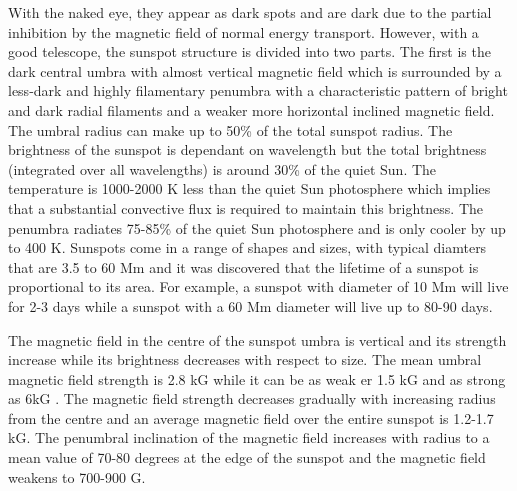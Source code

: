 	With the naked eye, they appear as dark spots and are dark due to the partial inhibition by the magnetic field  of normal energy transport.
	However, with a good telescope, the sunspot structure is divided into two parts.
	The first is the dark central umbra with almost vertical magnetic field which is surrounded by a less-dark and highly filamentary penumbra with a characteristic pattern of bright and dark radial filaments and a weaker more horizontal inclined magnetic field.
	The umbral radius can make up to 50\% of the total sunspot radius.
	The brightness of the sunspot is dependant on wavelength but the total brightness (integrated over all wavelengths) is around 30\% of the quiet Sun.
	The temperature is 1000-2000 K less than the quiet Sun photosphere which implies that a substantial convective flux is required to maintain this brightness.
	The penumbra radiates 75-85\% of the quiet Sun photosphere and is only cooler by up to 400 K.
	Sunspots come in a range of shapes and sizes, with typical diamters that are 3.5 to 60 Mm and it was discovered that the lifetime of a sunspot is proportional to its area. 
	For example, a sunspot with diameter of 10 Mm will live for 2-3 days while a sunspot with a 60 Mm diameter will live up to 80-90 days.
	
	The magnetic field in the centre of the sunspot umbra is vertical and its strength increase while its brightness decreases with respect to size.
	The mean umbral magnetic field strength is 2.8 kG while it can be as weak er 1.5 kG and as strong as 6kG \citep{2006SoPh..239...41L}.
	The magnetic field strength decreases gradually with increasing radius from the centre and an average magnetic field over the entire sunspot is 1.2-1.7 kG.
	The penumbral inclination of the magnetic field increases with radius to a mean value of 70-80 degrees at the edge of the sunspot and the magnetic field weakens to 700-900 G.

